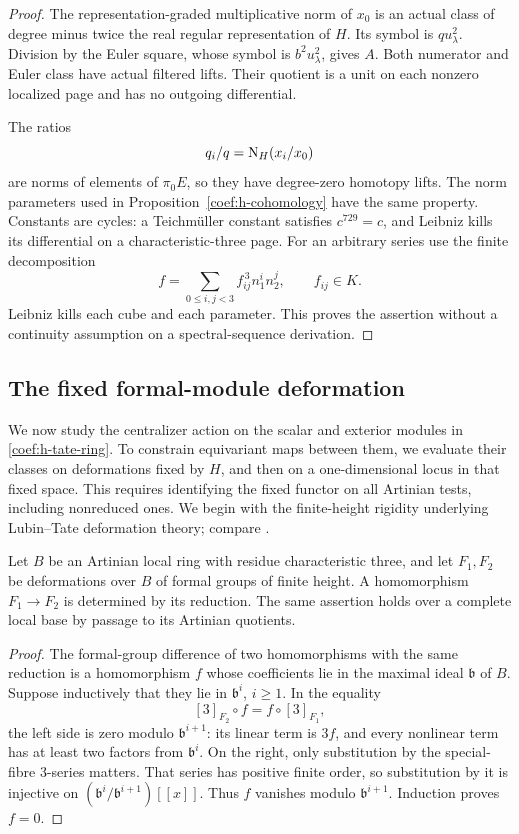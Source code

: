 \begin{proof}
The representation-graded multiplicative norm of \(x_0\) is an actual
class of degree minus twice the real regular representation of \(H\).
Its symbol is \(q u_\lambda^2\).  Division by the Euler square,
whose symbol is \(b^2u_\lambda^2\), gives \(A\).  Both numerator and
Euler class have actual filtered lifts.  Their quotient is a unit
on each nonzero localized page and has no outgoing differential.

The ratios
\[
 q_i/q=\operatorname{N}_H(x_i/x_0)
\]
are norms of elements of \(\pi_0E\), so they have degree-zero
homotopy lifts.  The norm parameters used in
Proposition~\ref{coef:h-cohomology} have the same property.
Constants are cycles: a Teichm\"uller constant satisfies
\(c^{729}=c\), and Leibniz kills its differential on a
characteristic-three page.  For an arbitrary series use the finite
decomposition
\[
 f=\sum_{0\le i,j<3}f_{ij}^{\,3}n_1^i n_2^j,\qquad f_{ij}\in K.
\]
Leibniz kills each cube and each parameter.  This proves the assertion
without a continuity assumption on a spectral-sequence derivation.
\end{proof}

\subsection{The fixed formal-module deformation}

We now study the centralizer action on the scalar and exterior modules
in \eqref{coef:h-tate-ring}. To constrain equivariant maps between them,
we evaluate their classes on deformations fixed by \(H\), and then on a
one-dimensional locus in that fixed space. This requires identifying
the fixed functor on all Artinian tests, including nonreduced ones.
We begin with the finite-height rigidity underlying
Lubin--Tate deformation theory; compare
\cite[Proposition~2.4]{LubinTate}.

\begin{lemma}\label{coef:rigidity}
Let \(B\) be an Artinian local ring with residue characteristic three,
and let \(F_1,F_2\) be deformations over \(B\) of formal groups of
finite height.  A homomorphism \(F_1\to F_2\) is determined by its
reduction.  The same assertion holds over a complete local base by
passage to its Artinian quotients.
\end{lemma}

\begin{proof}
The formal-group difference of two homomorphisms with the same
reduction is a homomorphism \(f\) whose coefficients lie in the maximal
ideal \(\mathfrak b\) of \(B\).  Suppose inductively that they lie in
\(\mathfrak b^i\), \(i\ge1\).  In the equality
\[
 [3]_{F_2}\circ f=f\circ[3]_{F_1},
\]
the left side is zero modulo \(\mathfrak b^{i+1}\): its linear term
is \(3f\), and every nonlinear term has at least two factors from
\(\mathfrak b^i\).  On the right, only substitution by the
special-fibre 3-series matters.  That series has positive finite
order, so substitution by it is injective on
\((\mathfrak b^i/\mathfrak b^{i+1})[[x]]\).
Thus \(f\) vanishes modulo \(\mathfrak b^{i+1}\).
Induction proves \(f=0\).
\end{proof}


